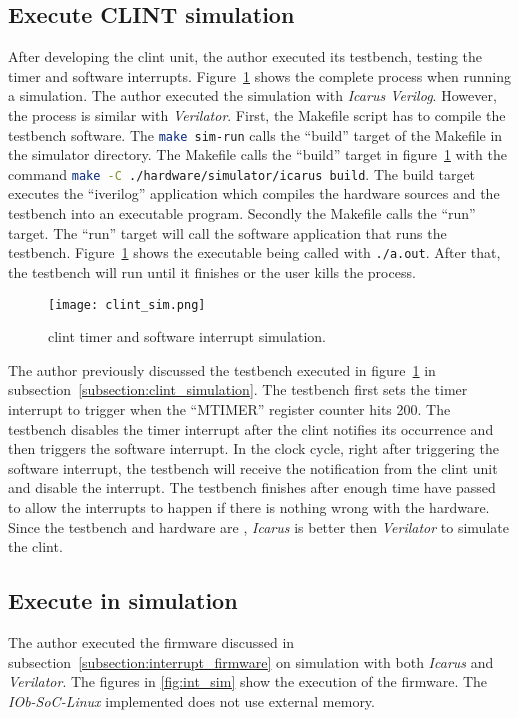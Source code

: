 \subsection{Execute CLINT simulation}
After developing the \acrshort{clint} unit, the author executed its testbench, testing the timer and software interrupts. Figure~\ref{fig:clint_sim} shows the complete process when running a simulation. The author executed the simulation with \textit{Icarus Verilog}. However, the process is similar with \textit{Verilator}. First, the Makefile script has to compile the testbench software. The \lstinline[language=bash]{make sim-run} calls the \enquote{build} target of the Makefile in the simulator directory. The Makefile calls the \enquote{build} target in figure~\ref{fig:clint_sim} with the command \lstinline[language=bash]{make -C ./hardware/simulator/icarus build}. The build target executes the \enquote{iverilog} application which compiles the hardware sources and the testbench into an executable program. Secondly the Makefile calls the \enquote{run} target. The \enquote{run} target will call the software application that runs the testbench. Figure~\ref{fig:clint_sim} shows the executable being called with \lstinline[language=bash]{./a.out}. After that, the testbench will run until it finishes or the user kills the process.

\begin{figure}[!ht]
    \centering
    \texttt{[image: clint\_sim.png]}
    \caption{\acrshort{clint} timer and software interrupt simulation.}
    \label{fig:clint_sim}
\end{figure}

The author previously discussed the testbench executed in figure~\ref{fig:clint_sim} in subsection~\ref{subsection:clint_simulation}. The testbench first sets the timer interrupt to trigger when the \enquote{MTIMER} register counter hits 200. The testbench disables the timer interrupt after the \acrshort{clint} notifies its occurrence and then triggers the software interrupt. In the clock cycle, right after triggering the software interrupt, the testbench will receive the notification from the \acrshort{clint} unit and disable the interrupt. The testbench finishes after enough time have passed to allow the interrupts to happen if there is nothing wrong with the hardware. Since the testbench and hardware are , \textit{Icarus} is better then \textit{Verilator} to simulate the \acrshort{clint}.

\subsection{Execute in simulation}
The author executed the firmware discussed in subsection~\ref{subsection:interrupt_firmware} on simulation with both \textit{Icarus} and \textit{Verilator}. The figures in \ref{fig:int_sim} show the execution of the firmware. The \textit{IOb-SoC-Linux} implemented does not use external memory.

